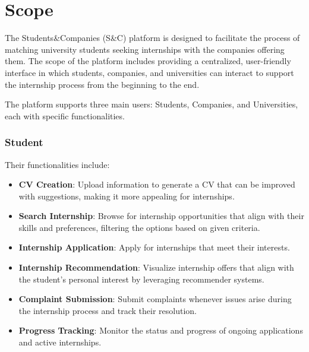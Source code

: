 \section{Scope}

The Students\&Companies (S\&C) platform is designed to facilitate the process of matching university students seeking internships with the companies offering them. The scope of the platform includes providing a centralized, user-friendly interface in which students, companies, and universities can interact to support the internship process from the beginning to the end. 

The platform supports three main users: Students, Companies, and Universities, each with specific functionalities.
\subsubsection*{Student}
Their functionalities  include:
\begin{itemize} 
    \item \textbf{CV Creation}: Upload information to generate a CV that can be improved with suggestions, making it more appealing for internships. 
    \item \textbf{Search Internship}: Browse for internship opportunities that align with their skills and preferences, filtering the options based on given criteria.
    \item \textbf{Internship Application}: Apply for internships that meet their interests.
    \item \textbf{Internship Recommendation}: Visualize internship offers that align with the student's personal interest by leveraging recommender systems.
    \item \textbf{Complaint Submission}: Submit complaints whenever issues arise during the internship process and track their resolution.
    \item \textbf{Progress Tracking}: Monitor the status and progress of ongoing applications and active internships.
\end{itemize}

